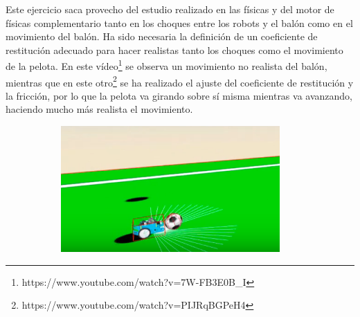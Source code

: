 Este ejercicio saca provecho del estudio realizado en las físicas y del motor de físicas complementario tanto en los choques entre los robots y el balón como en el movimiento del balón. Ha sido necesaria la definición de un coeficiente de restitución adecuado para hacer realistas tanto los choques como el movimiento de la pelota. En este vídeo\footnote{https://www.youtube.com/watch?v=7W-FB3E0B_I} se observa un movimiento no realista del balón, mientras que en este otro\footnote{https://www.youtube.com/watch?v=PIJRqBGPeH4} se ha realizado el ajuste del coeficiente de restitución y la fricción, por lo que la pelota va girando sobre sí misma mientras va avanzando, haciendo mucho más realista el movimiento.

\clearpage

\begin{figure}[h!]
  \begin{subfigure}[b]{0.2\textwidth}
    \includegraphics[width=\textwidth, height=\textwidth]{futbol1.png}
  \end{subfigure}
  \hfill
  \hfill
  \begin{subfigure}[b]{0.2\textwidth}

\end{subfigure}
\end{figure}
